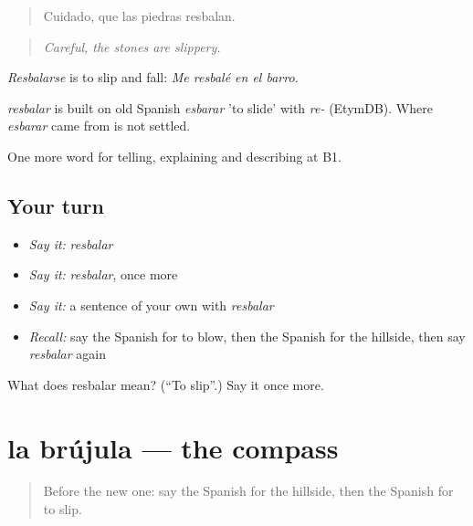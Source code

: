 \begin{quote}
Cuidado, que las piedras resbalan.
\end{quote}

\begin{quote}
\emph{Careful, the stones are slippery.}
\end{quote}

\emph{Resbalarse} is to slip and fall: \emph{Me resbalé en el barro.}

\begin{cousinweb}
\emph{resbalar} is built on old Spanish \emph{esbarar} 'to slide' with \emph{re-} (EtymDB). Where \emph{esbarar} came from is not settled.
\end{cousinweb}

\begin{grammarlens}[title={What you've built}]
One more word for telling, explaining and describing at B1.
\end{grammarlens}

\subsection*{Your turn}
\begin{itemize}
\raggedright
  \item \emph{Say it:} \emph{resbalar}
  \item \emph{Say it:} \emph{resbalar}, once more
  \item \emph{Say it:} a sentence of your own with \emph{resbalar}
  \item \emph{Recall:} say the Spanish for to blow, then the Spanish for the hillside, then say \emph{resbalar} again
\end{itemize}

\begin{tcolorbox}[breakable,colback=teal!4,colframe=teal!35!black,title={Before you move on}]
What does resbalar mean? (\textquotedblleft{}To slip\textquotedblright{}.) Say it once more.
\end{tcolorbox}
\section[la brújula]{la brújula — the compass}

\label{lesson:ES-C772-brujula}



\begin{quote}
Before the new one: say the Spanish for the hillside, then the Spanish for to slip.
\end{quote}

